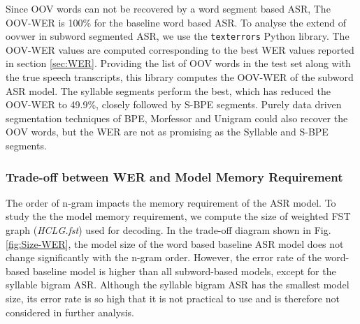 Since OOV words can not be recovered by a word segment based ASR, The OOV-WER
is 100\% for the baseline word based ASR. To analyse the extend of \gls{oovwer} in
subword segmented ASR, we use the \texttt{texterrors} Python
library\cite{braun2021comparison}. The OOV-WER values are computed
corresponding to the best WER values reported in section \ref{sec:WER}.
Providing the list of OOV words in the test set along with the true speech
transcripts, this library computes the OOV-WER of the subword ASR model. The
syllable segments perform the best, which has reduced the OOV-WER to 49.9\%,
closely followed by S-BPE segments. Purely data driven segmentation techniques
of BPE, Morfessor and Unigram could also recover the OOV words, but the WER are
not as promising as the Syllable and S-BPE segments.







\subsubsection{Trade-off between WER and Model Memory Requirement}

The order of n-gram impacts the memory requirement of the ASR model. To study
the the model memory requirement, we compute the size of weighted FST graph
(\textit{HCLG.fst}) used for decoding. In the trade-off diagram shown in Fig.
\ref{fig:Size-WER}, the model size of the word based baseline ASR model does
not change significantly with the n-gram order. However, the error rate of the
word-based baseline model is higher than all subword-based models, except for
the syllable bigram ASR. Although the syllable bigram ASR has the smallest
model size, its error rate is so high that it is not practical to use and is
therefore not considered in further analysis.

